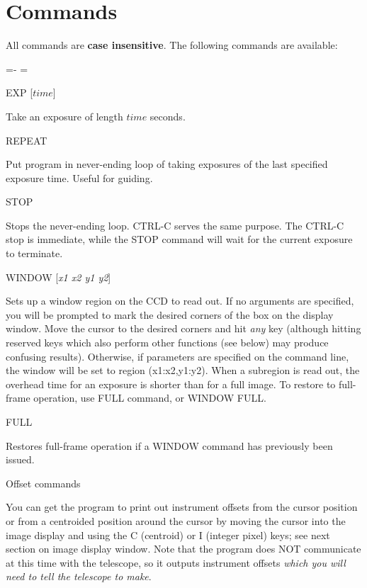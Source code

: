 \documentclass[10pt]{article}
\renewcommand{\[}{\begin{eqnarray}}
\renewcommand{\]}{\end{eqnarray}}
\newenvironment{hanging}{
        \begin{list}{}{
                \labelsep=0pt
                \labelwidth=0pt
                \listparindent=0pt
                \itemindent=-\leftmargini
                \leftmargin=\leftmargini
        }
}{
        \end{list}
}
\begin{document}
\section{Commands}

All commands are \textbf{case insensitive}.
The following commands are available:
\begin{hanging}
\item{EXP [$time$]}

Take an exposure of length $time$ seconds.

\item{REPEAT}

Put program in never-ending loop of taking exposures of the last specified
exposure time. Useful for guiding.

\item{STOP}

Stops the never-ending loop. CTRL-C serves the same purpose. The CTRL-C 
stop is immediate, while the STOP command will wait for the current exposure
to terminate.

\item{WINDOW [\textit{x1 x2 y1 y2}]}

Sets up a window region on the CCD to read out. If no arguments are
specified, you will be prompted to mark the desired corners of the
box on the display window. Move the cursor to the desired corners
and hit \textit{any} key (although hitting reserved keys which also
perform other functions (see below) may produce confusing results).
Otherwise, if parameters are specified on the command line, the 
window will be set to region (x1:x2,y1:y2).  When a
subregion is read out, the overhead time for an exposure is shorter than
for a full image. To restore to full-frame operation, use FULL command,
or WINDOW FULL.

\item{FULL}

Restores full-frame operation if a WINDOW command has previously been
issued.

\item {Offset commands}

You can get the program to print out instrument offsets from the cursor position
or from a centroided position around the cursor by moving the cursor into
the image display and using the C (centroid) or I (integer pixel) keys;
see next section on image display window. Note that the program does NOT
communicate at this time with the telescope, so it outputs instrument offsets
\textit{which you will need to tell the telescope to make}.


\end{hanging}
\end{document}
